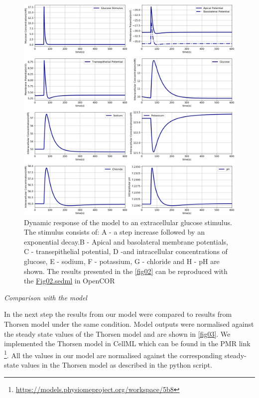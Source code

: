 \documentclass[fleqn,10pt]{physiome}
\begin{document}
\begin{figure}[ht]
\centering
\includegraphics[width=0.8\linewidth]{fig02.png}
\caption{Dynamic response of the model to an extracellular
glucose stimulus. The stimulus consists of: A - a step increase
followed by an exponential decay.B - Apical and basolateral
membrane potentials, C - transepithelial potential, D -and intracellular
concentrations of glucose, E - sodium, F - potassium, G - chloride and H - pH are shown. The results presented in the \autoref{fig02} can be reproduced with the \href{https://models.physiomeproject.org/workspace/572/file/59488c15178b09bcb5b11f795383b1435f7b7ef1/SEDML_files/Fig02.sedml}{Fig02.sedml} in OpenCOR}
\label{fig02}
\end{figure}

\textit{Comparison with the \cite{thorsen2014transepithelial} model}\newline

In the next step the results from our model were compared to results from Thorsen model under the same condition. Model outputs were normalised against the steady state values of the Thorsen model and are shown in \autoref{fig03}. We implemented the Thorsen model in CellML which can be found in the PMR link \footnote{\url{https://models.physiomeproject.org/workspace/5b8}}. All the values in our model are normalised against the corresponding steady-state values in the Thorsen model as described in the python script. \newpage
\end{document}
